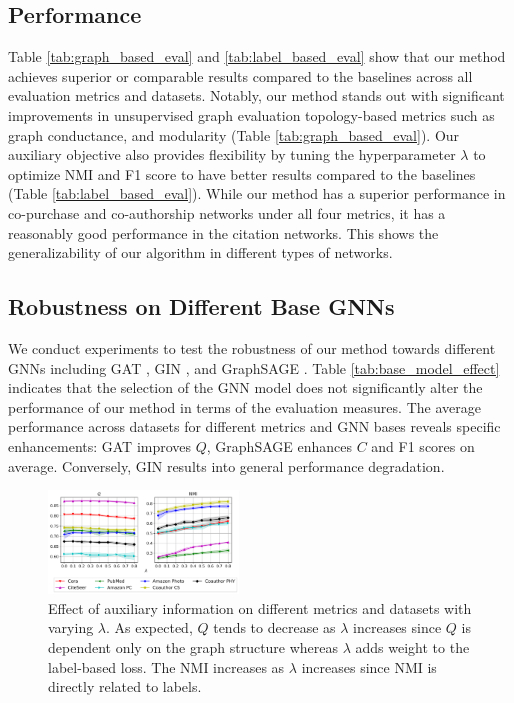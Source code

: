 \subsection{Performance}

Table \ref{tab:graph_based_eval} and \ref{tab:label_based_eval} show that our method achieves superior or comparable results compared to the baselines across all evaluation metrics and datasets. Notably, our method stands out with significant improvements in unsupervised graph evaluation topology-based metrics such as graph conductance, and modularity (Table \ref{tab:graph_based_eval}). Our auxiliary objective also provides flexibility by tuning the hyperparameter $\lambda$ to optimize NMI and F1 score to have better results compared to the baselines (Table \ref{tab:label_based_eval}). While our method has a superior performance in co-purchase and co-authorship networks under all four metrics, it has a reasonably good performance in the citation networks. This shows the generalizability of our algorithm in different types of networks.

\subsection{Robustness on Different Base GNNs}

We conduct experiments to test the robustness of our method towards different GNNs including GAT \cite{velickovic2017graph}, GIN \cite{xu2018powerful}, and GraphSAGE \cite{hamilton2017inductive}. Table \ref{tab:base_model_effect} indicates that the selection of the GNN model does not significantly alter the performance of our method in terms of the evaluation measures. The average performance across datasets for different metrics and GNN bases reveals specific enhancements: GAT improves $Q$, GraphSAGE enhances $C$ and F1 scores on average. Conversely, GIN results into general performance degradation.

\begin{figure}[h]
    \centering
    \includegraphics[width=0.45\textwidth]{figures/results_modularity_nmi.pdf}
    \caption{Effect of auxiliary information on different metrics and datasets with varying $\lambda$. As expected, $Q$ tends to decrease as $\lambda$ increases since $Q$ is dependent only on the graph structure whereas $\lambda$ adds weight to the label-based loss. The NMI increases as $\lambda$ increases since NMI is directly related to labels.}
    \label{fig:lambda_effect_on_modularity_nmi}
\end{figure}


